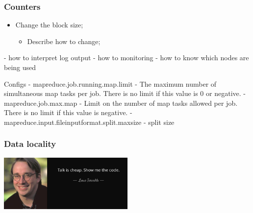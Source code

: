 \documentclass[aspectratio=169]{beamer}
\begin{document}
\begin{frame}
	\frametitle{Counters}

	\begin{itemize}
		\item Change the block size;
		      \begin{itemize}
			      \item Describe how to change;
		      \end{itemize}
	\end{itemize}
\end{frame}



- how to interpret log output
- how to monitoring
- how to know which nodes are being used

Configs
- mapreduce.job.running.map.limit - The maximum number of simultaneous map tasks per job. There is no limit if this value is 0 or negative.
- mapreduce.job.max.map - Limit on the number of map tasks allowed per job. There is no limit if this value is negative.
- mapreduce.input.fileinputformat.split.maxsize - split size


\begin{frame}
	\frametitle{Data locality}

	\begin{center}
		\includegraphics[height=1\textheight,width=0.5\textwidth,keepaspectratio]{./images/show-me-the-code.jpg}
	\end{center}
\end{frame}

\end{document}
